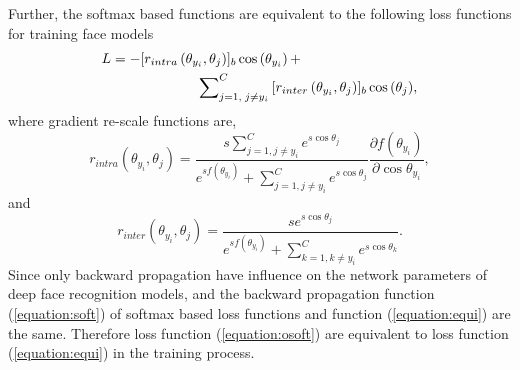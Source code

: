 \documentclass[journal,comsoc]{IEEEtran}
\begin{document}
Further, the softmax based functions are equivalent to the following loss functions for training face models
	\begin{equation}
	\begin{gathered}
	\label{equation:equi}
	L = 
	-[{{r_{intra}}\left( {{\theta _{{y_i}}}},{{\theta _{j}}} \right)]_b}\cos \left( {{\theta _{{y_i}}}} \right)+ \hfill \\
\quad\qquad\qquad\qquad \sum\nolimits_{j = 1,\;j \ne {y_i}}^C {{[{r_{inter}}\left({{\theta _{{y_i}}}},{{\theta _j}}\right)]_b}\cos\left( {{\theta _j}}\right)},
\end{gathered}\end{equation}where gradient re-scale functions are, \begin{equation}\label{eq:soft_intra_rescale}
{r_{intra}}\left( {{\theta _{{y_i}}}},{{\theta _{j}}} \right)=\frac{{s\sum\nolimits_{j = 1,j \ne {y_i}}^C {{e^{s\cos {\theta _j}}}} }}{{{e^{sf({\theta _{{y_i}}})}} + \sum\nolimits_{j = 1,j \ne {y_i}}^C {{e^{s\cos {\theta _j}}}} }}\frac{{\partial f({\theta _{{y_i}}})}}{{\partial \cos {\theta _{{y_i}}}}},\end{equation} and \begin{equation}\label{eq:soft_inter_rescale}
{r_{inter}}\left( {{\theta _{{y_i}}}}, {{\theta _j}} \right)=\frac{{s{e^{s\cos {\theta _j}}}}}{{{e^{sf({\theta _{{y_i}}})}} + \sum\nolimits_{k = 1,k \ne {y_i}}^C {{e^{s\cos {\theta _k}}}} }}.\end{equation} Since only backward propagation have influence on the network parameters of deep face recognition models, and the backward propagation function (\ref{equation:soft}) of softmax based loss functions and function (\ref{equation:equi}) are the same. Therefore loss function (\ref{equation:osoft}) are equivalent to loss function (\ref{equation:equi}) in the training process. 
\end{document}
